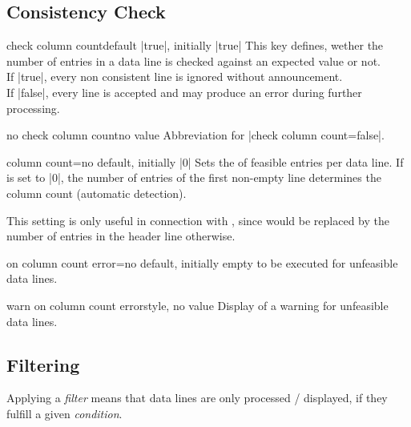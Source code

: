 \documentclass[a4paper,11pt]{ltxdoc}
\begin{document}
\clearpage
\subsection{Consistency Check}\label{sec:consistency}%

\begin{docCsvKey}{check column count}{}{default |true|, initially |true|}
  This key defines, wether the number of entries in a data line is checked against
  an expected value or not.\\
  If |true|, every non consistent line is ignored without announcement.\\
  If |false|, every line is accepted and may produce an error during
  further processing.
\end{docCsvKey}


\begin{docCsvKey}{no check column count}{}{no value}
  Abbreviation for |check column count=false|.
\end{docCsvKey}


\begin{docCsvKey}[][doc updated=2021-06-24]{column count}{=}{no default, initially |0|}
  Sets the  of feasible entries per data line.
  If  is set to |0|, the number of entries of
  the first non-empty line determines the column count (automatic detection).

  This setting is only useful in connection with ,
  since  would be replaced by the number of entries in the
  header line otherwise.
\end{docCsvKey}


\begin{docCsvKey}{on column count error}{=}{no default, initially empty}
   to be executed for unfeasible data lines.
\end{docCsvKey}


\begin{docCsvKey}{warn on column count error}{}{style, no value}
  Display of a warning for unfeasible data lines.
\end{docCsvKey}


\clearpage
\subsection{Filtering}\label{subsec:filtering}%

Applying a \emph{filter} means that data lines are only processed / displayed,
if they fulfill a given \emph{condition}.
\end{document}

